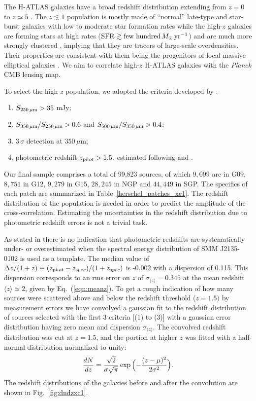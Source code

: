 The H-ATLAS galaxies have a broad redshift distribution extending from $z=0$ to $z\simeq 5$ \citep{Pearson2013}. The $z \lesssim 1$ population is mostly made of ``normal'' late-type and star-burst galaxies with low to moderate star formation rates  \citep[SFRs;][]{Dunne2011,Guo2011} while the high-$z$ galaxies are forming stars at high rates ($\hbox{SFR}\gtrsim \hbox{few hundred}\,M_{\odot}\,\hbox{yr}^{-1}$) and are much more strongly clustered \citep{Maddox2010,Xia2012}, implying that they are tracers of large-scale overdensities. Their properties are consistent with them being the progenitors of local massive elliptical galaxies \citep{Lapi2011}. We aim to correlate high-$z$ H-ATLAS galaxies with the \textit{Planck} \gls{CMB} lensing map.

To select the high-$z$ population, we adopted the criteria developed by \cite{Gonzalez-Nuevo2012}: 
\begin{enumerate}
\item{$S_{250\,\mu\rm m}>35$ mJy;}
\item{$S_{350\,\mu\rm m}/S_{250\,\mu\rm m}>0.6$ and $S_{500\,\mu\rm m}/S_{350\,\mu\rm m}>0.4$;} 
\item{$3\,\sigma$ detection at $350\,\mu$m;} 
\item{photometric redshift $z_{\rm phot}>1.5$, estimated following \cite{Lapi2011} and \cite{Gonzalez-Nuevo2012}.}
\end{enumerate}

Our final sample comprises a total of 99,823 sources, of which $9,099$ are in G09, $8,751$ in G12, $9,279$ in G15, $28,245$ in NGP and $44,449$ in SGP. The specifics of each patch are summarized in Table~\eqref{herschel_patches_xc1}. The redshift distribution of the population is needed in order to predict the amplitude of the cross-correlation. Estimating the uncertainties in the redshift distribution due to photometric redshift errors is not a trivial task. 

As stated in \cite{Gonzalez-Nuevo2012} there is no indication that photometric redshifts are systematically under- or overestimated when the spectral energy distribution of SMM J2135-0102 is used as a template. The median value of $ \Delta z/(1 + z) \equiv (z_{\rm phot} -  z_{\rm spec})/(1 + z_{\rm spec})$ is -0.002 with a dispersion of 0.115. This dispersion corresponds to an rms error on $z$ of $\sigma_{\langle z \rangle}=  0.345$ at the mean redshift $\langle z \rangle\simeq 2$, given by Eq.~(\eqref{eqn:meanz}). To get a rough indication of how many sources were scattered above and below the redshift threshold ($z=1.5)$ by measurement errors we have convolved a gaussian fit to the redshift distribution of sources selected with the first 3 criteria [(1) to (3)] with a gaussian error distribution having zero mean and dispersion $\sigma_{\langle z \rangle}$. The convolved redshift distribution was cut at $z = 1.5$, and the portion at higher $z$ was fitted with a half-normal distribution normalized to unity:
%
\begin{equation}
\frac{dN}{dz} = \frac{\sqrt{2}}{\sigma\sqrt{\pi}}\exp{\Bigl( -\frac{(z-\mu)^2}{2\sigma^2}\Bigr)}.
\end{equation}
%
The redshift distributions of the galaxies before and after the convolution are shown in Fig.~\eqref{fig:dndzxc1}.

